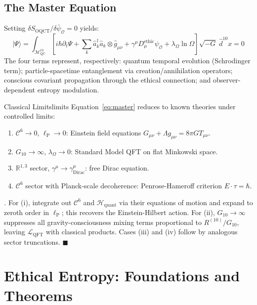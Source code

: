 \documentclass[12pt,a4paper]{article}
\theoremstyle{myrmk}
\renewenvironment{proof}[1][\proofname]{%
  \par\noindent\textit{#1.}\enspace\ignorespaces}{\hfill$\blacksquare$\par\medskip}
\newcommand{\Mmanifold}{\mathcal{M}^{10}_{\mathrm{QC}}}
\newcommand{\lP}{\ell_{\mathrm{P}}}
\newcommand{\cC}{\mathcal{C}^{6}}
\newcommand{\HH}{\mathcal{H}_{\mathrm{quant}}}
\newcommand{\ket}[1]{|#1\rangle}
\begin{document}
\subsection{The Master Equation}

Setting $\delta S_{\mathrm{OQCT}}/\delta\bar{\psi}_{\mathcal{O}}=0$ yields:
\begin{equation}
  \boxed{
  \ket{\Psi} = \int_{\Mmanifold}
    \left[i\hbar\partial_t\Psi
      + \sum_k \hat{a}^\dagger_k\hat{a}_k \otimes \hat{g}_{\mu\nu}
      + \gamma^\mu D^\mathrm{ethic}_\mu\psi_{\mathcal{O}}
      + \lambda_\Omega\ln\Omega\right]
    \sqrt{-G}\;\hat{d}^{10}x = 0}
  \label{eq:master}
\end{equation}
The four terms represent, respectively: quantum temporal evolution (Schrodinger term);
particle-spacetime entanglement via creation/annihilation operators; conscious
covariant propagation through the ethical connection; and observer-dependent entropy
modulation.

\begin{proposition}{Classical Limits}{limits}
Equation~\eqref{eq:master} reduces to known theories under controlled limits:
\begin{enumerate}[label=(\roman*)]
  \item $\cC\to0$, $\lP\to0$: Einstein field equations $G_{\mu\nu}+\Lambda g_{\mu\nu}=8\pi G T_{\mu\nu}$.
  \item $G_{10}\to\infty$, $\lambda_\Omega\to0$: Standard Model QFT on flat Minkowski space.
  \item $\mathbb{R}^{1,3}$ sector, $\gamma^\mu\to\gamma^\mu_{\mathrm{Dirac}}$: free Dirac equation.
  \item $\cC$ sector with Planck-scale decoherence: Penrose-Hameroff criterion $E\cdot\tau=\hbar$.
\end{enumerate}
\end{proposition}

\begin{proof}
For (i), integrate out $\cC$ and $\HH$ via their equations of motion and expand
to zeroth order in $\lP$; this recovers the Einstein-Hilbert action.
For (ii), $G_{10}\to\infty$ suppresses all gravity-consciousness mixing terms
proportional to $R^{(10)}/G_{10}$, leaving $\mathcal{L}_{\mathrm{QFT}}$ with
classical products. Cases (iii) and (iv) follow by analogous sector truncations.
\end{proof}

\section{Ethical Entropy: Foundations and Theorems}
\label{sec:ethical_entropy}
\end{document}
